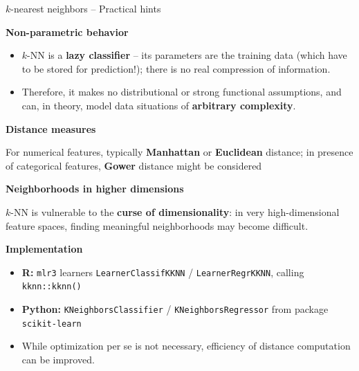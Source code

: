 \documentclass[11pt,compress,t,notes=noshow, xcolor=table]{beamer}
\newcommand{\highlight}[1]{\textcolor{highlightcol}{\textbf{#1}}}
\let\code=\texttt
\begin{document}
\begin{frame}{$k$-nearest neighbors -- Practical hints}

\footnotesize

\highlight{Non-parametric behavior}

\begin{itemize}
  \item $k$-NN is a \textbf{lazy classifier} -- its parameters are the training 
  data (which have to be stored for prediction!); there is no real compression 
  of information.
  \item Therefore, it makes no distributional or strong functional assumptions, 
  and can, in theory, model data situations of \textbf{arbitrary complexity}.
\end{itemize}

\medskip

\highlight{Distance measures}

For numerical features, typically \textbf{Manhattan} or \textbf{Euclidean} 
distance; in presence of categorical features, \textbf{Gower} distance might be 
considered

\medskip

\highlight{Neighborhoods in higher dimensions}

$k$-NN is vulnerable to the \textbf{curse of dimensionality}: in very
high-dimensional feature spaces, finding meaningful neighborhoods may become
difficult.

\medskip

\highlight{Implementation}
\begin{itemize}
  \item \textbf{R:} \code{mlr3} learners \code{LearnerClassifKKNN} /
  \code{LearnerRegrKKNN}, calling \code{kknn::kknn()}
  \item \textbf{Python:} \code{KNeighborsClassifier} / 
  \code{KNeighborsRegressor} from package \code{scikit-learn}
  \item While optimization per se is not necessary, efficiency of distance 
  computation can be improved.
\end{itemize}

\end{frame}

\end{document}
